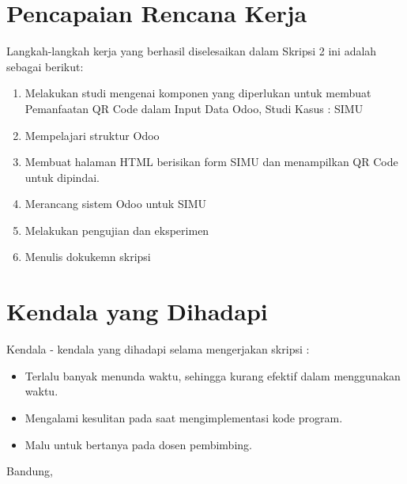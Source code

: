 \documentclass[a4paper,twoside]{article}
\begin{document}
\section{Pencapaian Rencana Kerja}
Langkah-langkah kerja yang berhasil diselesaikan dalam Skripsi 2 ini adalah sebagai berikut:
\begin{enumerate}
\item Melakukan studi mengenai komponen yang diperlukan untuk membuat Pemanfaatan QR Code dalam Input Data Odoo, Studi Kasus : SIMU
\item Mempelajari struktur Odoo
\item Membuat halaman HTML berisikan form SIMU dan menampilkan QR Code untuk dipindai.
\item Merancang sistem Odoo untuk SIMU
\item Melakukan pengujian dan eksperimen
\item Menulis dokukemn skripsi
\end{enumerate}



\section{Kendala yang Dihadapi}
Kendala - kendala yang dihadapi selama mengerjakan skripsi :
\begin{itemize}
	\item Terlalu banyak menunda waktu, sehingga kurang efektif dalam menggunakan waktu.
	\item Mengalami kesulitan pada saat mengimplementasi kode program.
	\item Malu untuk bertanya pada dosen pembimbing.

\end{itemize}

\vspace{1cm}
\centering Bandung, \tanggal\\
\vspace{2cm} \nama \\ 
\vspace{1cm}
\end{document}
